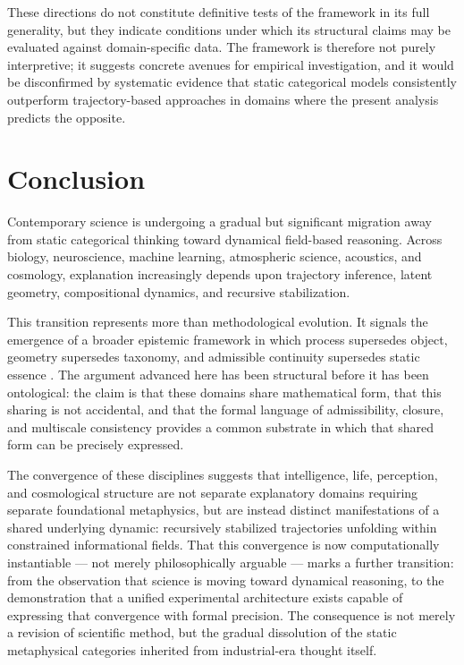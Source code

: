 \documentclass[12pt,a4paper]{article}
\begin{document}
These directions do not constitute definitive tests of the framework in its full
generality, but they indicate conditions under which its structural claims may be
evaluated against domain-specific data. The framework is therefore not purely
interpretive; it suggests concrete avenues for empirical investigation, and it would
be disconfirmed by systematic evidence that static categorical models consistently
outperform trajectory-based approaches in domains where the present analysis predicts
the opposite.

\section{Conclusion}

Contemporary science is undergoing a gradual but significant migration away from
static categorical thinking toward dynamical field-based reasoning. Across biology,
neuroscience, machine learning, atmospheric science, acoustics, and cosmology,
explanation increasingly depends upon trajectory inference, latent geometry,
compositional dynamics, and recursive stabilization.

This transition represents more than methodological evolution. It signals the emergence
of a broader epistemic framework in which process supersedes object, geometry supersedes
taxonomy, and admissible continuity supersedes static essence \cite{BlindSpot}. The
argument advanced here has been structural before it has been ontological: the claim
is that these domains share mathematical form, that this sharing is not accidental,
and that the formal language of admissibility, closure, and multiscale consistency
provides a common substrate in which that shared form can be precisely expressed.

The convergence of these disciplines suggests that intelligence, life, perception, and
cosmological structure are not separate explanatory domains requiring separate
foundational metaphysics, but are instead distinct manifestations of a shared
underlying dynamic: recursively stabilized trajectories unfolding within constrained
informational fields. That this convergence is now computationally instantiable ---
not merely philosophically arguable --- marks a further transition: from the observation
that science is moving toward dynamical reasoning, to the demonstration that a unified
experimental architecture exists capable of expressing that convergence with formal
precision. The consequence is not merely a revision of scientific method, but the
gradual dissolution of the static metaphysical categories inherited from
industrial-era thought itself.
\end{document}
